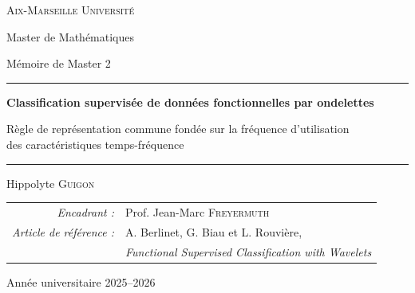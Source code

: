\newcommand{\R}{\mathbb{R}}
\newcommand{\N}{\mathbb{N}}
\newcommand{\PP}{\mathbb{P}}
\newcommand{\E}{\mathbb{E}}
\newcommand{\1}{\mathds{1}}
\newcommand{\Lp}{L^2([0,1])}
\newcommand{\cH}{\mathcal{H}}
\newcommand{\cF}{\mathcal{F}}
\newcommand{\cD}{\mathcal{D}}
\newcommand{\cC}{\mathcal{C}}
\newcommand{\cA}{\mathcal{A}}
\newcommand{\bD}{\mathbf{D}}
\newcommand{\bX}{\mathbf{X}}
\newcommand{\bx}{\mathbf{x}}
\newcommand{\tX}{\widetilde{\mathbf{X}}}
\newcommand{\tx}{\widetilde{\mathbf{x}}}
\newcommand{\Sh}{\mathbb{S}}
\newcommand{\hphi}{\widehat{\varphi}}
\newcommand{\hS}{\widehat{S}}
\newcommand{\hsigma}{\widehat{\sigma}}
\newcommand{\hL}{\widehat{L}}
\newcommand{\hg}{\widehat{g}}
\newcommand{\hd}{\widehat{d}}
\newcommand{\hc}{\widehat{c}}
\newcommand{\Dn}{\mathcal{D}_n}
\newcommand{\eqdef}{\coloneqq}
\DeclareMathOperator*{\argmin}{arg\,min}
\DeclareMathOperator{\Card}{Card}
\DeclareMathOperator{\Var}{Var}
\DeclareMathOperator{\Id}{Id}



\begin{titlepage}
\centering
{\large\scshape Aix-Marseille Université\par}
\vspace{0.2cm}
{\normalsize Master de Mathématiques\par}
\vspace{0.1cm}
{\normalsize Mémoire de Master 2\par}

\vspace{3cm}
\rule{\linewidth}{0.6pt}\par
\vspace{0.5cm}
{\LARGE\bfseries\color{bleuamu} Classification supervisée de données fonctionnelles par ondelettes\par}
\vspace{0.4cm}
{\large Règle de représentation commune fondée sur la fréquence d'utilisation\\ des caractéristiques temps-fréquence\par}
\vspace{0.5cm}
\rule{\linewidth}{0.6pt}\par

\vspace{2.5cm}
{\Large Hippolyte \textsc{Guigon}\par}

\vfill
\begin{tabular}{rl}
\textit{Encadrant :} & Prof. Jean-Marc \textsc{Freyermuth} \\[2pt]
\textit{Article de référence :} & A. Berlinet, G. Biau et L. Rouvière,\\
& \emph{Functional Supervised Classification with Wavelets}
\end{tabular}

\vspace{1.5cm}
{\normalsize Année universitaire 2025--2026\par}
\end{titlepage}
\cleardoublepage


